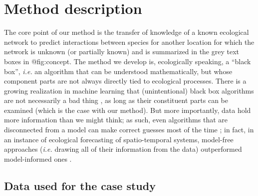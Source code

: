 \section{Method description}\label{method-description}

The core point of our method is the transfer of knowledge of a known
ecological network to predict interactions between species for another
location for which the network is unknown (or partially known) and is
summarized in the grey text boxes in @fig:concept. The method we develop
is, ecologically speaking, a ``black box'', \emph{i.e.} an algorithm
that can be understood mathematically, but whose component parts are not
always directly tied to ecological processes. There is a growing
realization in machine learning that (unintentional) black box
algorithms are not necessarily a bad thing \cite{Holm2019DefBla}, as
long as their constituent parts can be examined (which is the case with
our method). But more importantly, data hold more information than we
might think; as such, even algorithms that are disconnected from a model
can make correct guesses most of the time \cite{Halevy2009UnrEff}; in
fact, in an instance of ecological forecasting of spatio-temporal
systems, model-free approaches (\emph{i.e.} drawing all of their
information from the data) outperformed model-informed ones
\cite{Perretti2013ModFor}.

\subsection{Data used for the case
study}\label{data-used-for-the-case-study}


